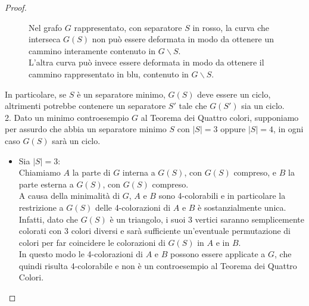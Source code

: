 \documentclass[a4paper,12pt,titlepage]{report}
\begin{document}
\begin{proof}
\begin{figure}[H]
{
    	}
    		\vspace{0.5cm}
    		\caption{Nel grafo $G$ rappresentato, con separatore $S$ in rosso, la curva che interseca $G(S)$ non può essere deformata in modo da ottenere un cammino interamente contenuto in $G \smallsetminus S$.
    		\\L'altra curva può invece essere deformata in modo da ottenere il cammino rappresentato in blu, contenuto in $G \smallsetminus S$.}
    	\end{figure}
    	In particolare, se $S$ è un separatore minimo, $G(S)$ deve essere un ciclo, altrimenti potrebbe contenere un separatore $S'$ tale che $G(S')$ sia un ciclo.
    	\vspace{0.3cm}
    	\\2. Dato un minimo controesempio $G$ al Teorema dei Quattro colori, supponiamo per assurdo che abbia un separatore minimo $S$ con $\lvert S \rvert = 3$ oppure $\lvert S \rvert = 4$, in ogni caso $G(S)$ sarà un ciclo.
    	\begin{itemize}
    		\item Sia $\lvert S \rvert = 3$:
    		\\Chiamiamo $A$ la parte di $G$ interna a $G(S)$, con $G(S)$ compreso, e $B$ la parte esterna a $G(S)$, con $G(S)$ compreso.
    		\\A causa della minimalità di $G$, $A$ e $B$ sono 4-colorabili e in particolare la restrizione a $G(S)$ delle 4-colorazioni di $A$ e $B$ è sostanzialmente unica.
    		\\Infatti, dato che $G(S)$ è un triangolo, i suoi 3 vertici saranno semplicemente colorati con 3 colori diversi e sarà sufficiente un'eventuale permutazione di colori per far coincidere le colorazioni di $G(S)$ in $A$ e in $B$.
    		\\In questo modo le 4-colorazioni di $A$ e $B$ possono essere applicate a $G$, che quindi risulta 4-colorabile e non è un controesempio al Teorema dei Quattro Colori.
    		\begin{figure}[H]
    			\centering
\end{figure}
\end{itemize}
\end{proof}
\end{document}
